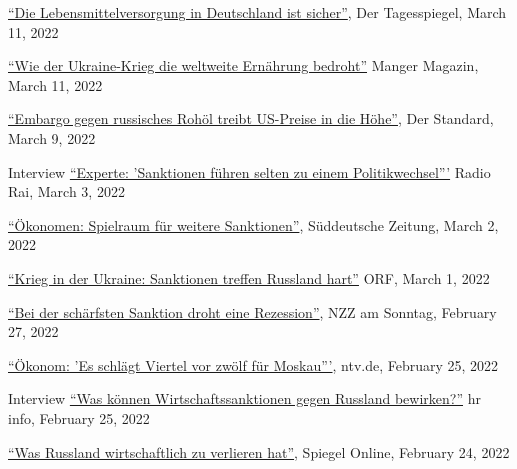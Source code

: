 \documentclass{article}
\newlength{\cvlabelwidth}\setlength{\cvlabelwidth}{0.12\textwidth}
\newlength{\cvlabelgap}\setlength{\cvlabelgap}{5mm}
\newcommand{\cvmakelabel}[1]{%
    \smash{\parbox[t]{\cvlabelwidth}{\raggedright{\fontfamily{phv}\selectfont #1}}}}
\newenvironment{cvsection}[1]{%
    \par\medskip
    \begin{list}{}{%
        \setlength{\leftmargin}{\dimexpr\cvlabelwidth+\cvlabelgap\relax}%
        \setlength{\labelwidth}{\cvlabelwidth}%
        \setlength{\labelsep}{\cvlabelgap}%
        \setlength{\rightmargin}{0pt}%
        \setlength{\itemindent}{0pt}%
        \setlength{\listparindent}{0pt}%
        \setlength{\topsep}{0pt}%
        \setlength{\partopsep}{0pt}%
        \setlength{\parsep}{0.3em}%
        \setlength{\itemsep}{0pt}%
        \let\makelabel\cvmakelabel%
    }%
    \item[#1]\ignorespaces%
}{%
    \end{list}\medskip%
}
\begin{document}
\begin{cvsection}{SELECTED MEDIA APPEARANCE}
    \href{https://www.tagesspiegel.de/wirtschaft/agrarminister-cem-oezdemir-zu-den-folgen-des-kriegs-die-lebensmittelversorgung-in-deutschland-ist-sicher/28155160.html}{``Die Lebensmittelversorgung in Deutschland ist sicher''}, Der Tagesspiegel, March 11, 2022 \par
    \href{https://www.manager-magazin.de/politik/wie-es-um-die-ernaehrungssicherheit-steht-ausfall-der-ukraine-als-getreide-exporteur-trifft-afrika-hart-a-fdf304e9-e490-4d78-8cf1-f56464958af1}{``Wie der Ukraine-Krieg die weltweite Ernährung bedroht''} Manger Magazin, March 11, 2022 \par
    \href{https://www.derstandard.at/story/2000133979024/embargo-gegen-russisches-rohoel-treibt-us-preise-in-die-hoehe}{``Embargo gegen russisches Rohöl treibt US-Preise in die Höhe''}, Der Standard, March 9, 2022 \par
    Interview \href{https://www.rainews.it/tgr/tagesschau/audio/2022/03/tag-Hendrik-Mahlkow-Institut-fuer-Weltwirtschaft-Kiel-Sanktionen-Russland-Ukrainekrieg-4be0c70d-61c5-4749-9088-689b3ee625f2.html}{``Experte: 'Sanktionen führen selten zu einem Politikwechsel'''} Radio Rai, March 3, 2022 \par
    \href{https://www.sueddeutsche.de/wirtschaft/strafmassnahmen-oekonomen-spielraum-fuer-weitere-sanktionen-1.5538934}{``Ökonomen: Spielraum für weitere Sanktionen''}, Süddeutsche Zeitung, March 2, 2022 \par
    \href{https://orf.at/stories/3250156/}{``Krieg in der Ukraine: Sanktionen treffen Russland hart''} ORF, March 1, 2022 \par
    \href{https://magazin.nzz.ch/nzz-am-sonntag/international/bei-der-schaerfsten-sanktion-droht-eine-rezession-ld.1671972?reduced=true}{``Bei der schärfsten Sanktion droht eine Rezession''}, NZZ am Sonntag, February 27, 2022 \par
    \href{https://www.n-tv.de/wirtschaft/Okonom-Es-schlaegt-Viertel-vor-zwoelf-fuer-Moskau-article23155253.html}{``Ökonom: 'Es schlägt Viertel vor zwölf für Moskau'''}, ntv.de, February 25, 2022 \par
    Interview \href{https://www.hr-inforadio.de/programm/themen/ukraine-krieg-was-koennen-wirtschaftssanktionen-gegen-russland-bewirken,ukraine-konflikt-was-koennen-sanktionen-bewirken-100.html}{``Was können Wirtschaftssanktionen gegen Russland bewirken?''} hr info, February 25, 2022 \par
    \href{https://www.spiegel.de/wirtschaft/russland-und-die-eu-was-russland-wirtschaftlich-zu-verlieren-hat-a-09eb6357-9607-45f8-bfb8-d39ef5e71b86}{``Was Russland wirtschaftlich zu verlieren hat''}, Spiegel Online, February 24, 2022 \par

\end{cvsection}
\end{document}
